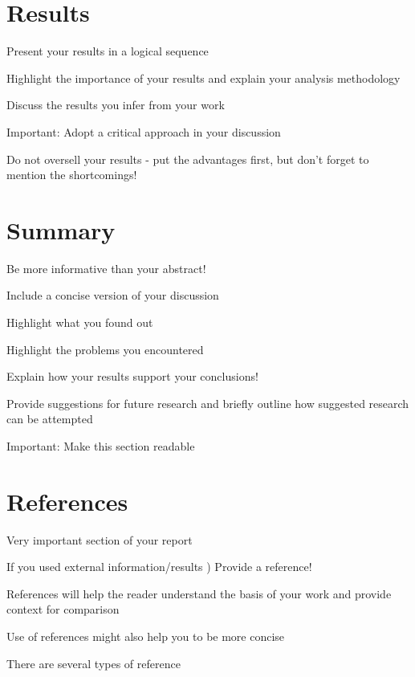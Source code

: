 \documentclass[lnicst,a4paper]{svmultln}
\begin{document}
\section{Results}

Present your results in a logical sequence

Highlight the importance of your results and explain your
analysis methodology

Discuss the results you infer from your work

Important:
Adopt a critical approach in your discussion

Do not oversell your results - put the advantages first, but
don’t forget to mention the shortcomings!





\section{Summary}

Be more informative than your abstract!

Include a concise version of your discussion

Highlight what you found out

Highlight the problems you encountered

Explain how your results support your conclusions!

Provide suggestions for future research and briefly outline how
suggested research can be attempted

Important:
Make this section readable





\section{References}
Very important section of your report

If you used external information/results
)
Provide a
reference!

References will help the reader understand the basis of your
work and provide context for comparison

Use of references might also help you to be more concise

There are several types of reference
\end{document}
